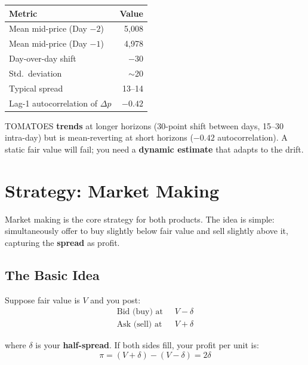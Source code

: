 \documentclass[11pt, letterpaper]{article}
\begin{document}
\begin{center}
\begin{tabular}{lr}
\toprule
\textbf{Metric} & \textbf{Value} \\
\midrule
Mean mid-price (Day $-2$) & 5{,}008 \\
Mean mid-price (Day $-1$) & 4{,}978 \\
Day-over-day shift & $-30$ \\
Std.\ deviation & $\sim$20 \\
Typical spread & 13--14 \\
Lag-1 autocorrelation of $\Delta p$ & $-0.42$ \\
\bottomrule
\end{tabular}
\end{center}

\begin{keyinsight}
TOMATOES \textbf{trends} at longer horizons (30-point shift between days, 15--30 intra-day) but is mean-reverting at short horizons ($-0.42$ autocorrelation). A static fair value will fail; you need a \textbf{dynamic estimate} that adapts to the drift.
\end{keyinsight}


\section{Strategy: Market Making}

Market making is the core strategy for both products. The idea is simple: simultaneously offer to buy slightly below fair value and sell slightly above it, capturing the \textbf{spread} as profit.

\subsection{The Basic Idea}

Suppose fair value is $V$ and you post:
\begin{align}
    \text{Bid (buy) at } &\; V - \delta \\
    \text{Ask (sell) at } &\; V + \delta
\end{align}

where $\delta$ is your \textbf{half-spread}. If both sides fill, your profit per unit is:
\begin{equation}
    \pi = (V + \delta) - (V - \delta) = 2\delta
\end{equation}
\end{document}
